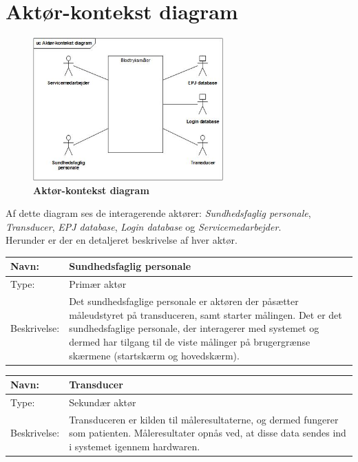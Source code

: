 \newpage

\section{Aktør-kontekst diagram}
\begin{figure}[h!]
\includegraphics[width =0.65\textwidth , left]{billeder/Aktorkontekst.jpg}
\caption{\textbf{Aktør-kontekst diagram}}
\end{figure}

Af dette diagram ses de interagerende aktører: \textit{Sundhedsfaglig personale}, \textit{Transducer}, \textit{EPJ database}, \textit{Login database} og \textit{Servicemedarbejder}.\\ Herunder er der en detaljeret beskrivelse af hver aktør.

\begin{table}[h!]
\begin{tabular}{| >{\raggedright\arraybackslash}p{3cm} | >{\raggedright\arraybackslash}p{12cm} |}
   \hline
   Navn: & Sundhedsfaglig personale\\ \hline
   Type: & Primær aktør \\ \hline
   Beskrivelse: & Det sundhedsfaglige personale er aktøren der påsætter måleudstyret på transduceren, samt starter målingen. Det er det sundhedsfaglige personale, der interagerer med systemet og dermed har tilgang til de viste målinger på brugergrænse skærmene (startskærm og hovedskærm).\\ \hline
\end{tabular}
\end{table}


\begin{table}[h!]
\begin{tabular}{| >{\raggedright\arraybackslash}p{3cm} | >{\raggedright\arraybackslash}p{12cm} |}
   \hline
   Navn: & Transducer\\ \hline
   Type: & Sekundær aktør \\ \hline
   Beskrivelse: & Transduceren er kilden til måleresultaterne, og dermed fungerer som patienten. Måleresultater opnås ved, at disse data sendes ind i systemet igennem hardwaren.\\ \hline
\end{tabular}
\end{table}


